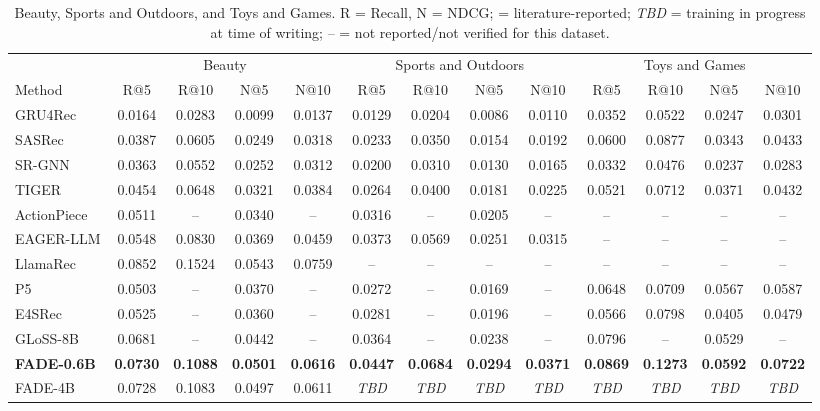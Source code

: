 \documentclass[runningheads]{llncs}
\begin{document}
\begin{table}[H]
\centering
\caption{Beauty, Sports and Outdoors, and Toys and Games. R = Recall, N = NDCG; \textdagger{} = literature-reported; \emph{TBD} = training in progress at time of writing; -- = not reported/not verified for this dataset.}
\label{tab:beauty}
\tiny
\setlength{\tabcolsep}{2pt}
\begin{tabular}{lcccccccccccc}
\toprule
& \multicolumn{4}{c}{Beauty} & \multicolumn{4}{c}{Sports and Outdoors} & \multicolumn{4}{c}{Toys and Games} \\
\cmidrule(lr){2-5} \cmidrule(lr){6-9} \cmidrule(lr){10-13}
Method & R@5 & R@10 & N@5 & N@10 & R@5 & R@10 & N@5 & N@10 & R@5 & R@10 & N@5 & N@10 \\
\midrule
GRU4Rec\textdagger{}& 0.0164 & 0.0283 & 0.0099 & 0.0137 & 0.0129 & 0.0204 & 0.0086 & 0.0110 & 0.0352 & 0.0522 & 0.0247 & 0.0301 \\
SASRec\textdagger{}& 0.0387 & 0.0605 & 0.0249 & 0.0318 & 0.0233 & 0.0350 & 0.0154 & 0.0192 & 0.0600 & 0.0877 & 0.0343 & 0.0433 \\
SR-GNN      & 0.0363 & 0.0552 & 0.0252 & 0.0312 & 0.0200 & 0.0310 & 0.0130 & 0.0165 & 0.0332 & 0.0476 & 0.0237 & 0.0283 \\
TIGER\textdagger{}       & 0.0454 & 0.0648 & 0.0321 & 0.0384 & 0.0264 & 0.0400 & 0.0181 & 0.0225 & 0.0521 & 0.0712 & 0.0371 & 0.0432 \\
ActionPiece\textdagger{} & 0.0511 & --     & 0.0340 & --     & 0.0316 & --     & 0.0205 & --     & -- & -- & -- & -- \\
EAGER-LLM\textdagger{}   & 0.0548 & 0.0830 & 0.0369 & 0.0459 & 0.0373 & 0.0569 & 0.0251 & 0.0315 & -- & -- & -- & -- \\
LlamaRec\textdagger{}    & 0.0852 & 0.1524 & 0.0543 & 0.0759 & --     & --     & --     & --     & -- & -- & -- & -- \\
P5\textdagger{}          & 0.0503 & --     & 0.0370 & --     & 0.0272 & --     & 0.0169 & --     & 0.0648 & 0.0709 & 0.0567 & 0.0587 \\
E4SRec\textdagger{}      & 0.0525 & --     & 0.0360 & --     & 0.0281 & --     & 0.0196 & --     & 0.0566 & 0.0798 & 0.0405 & 0.0479 \\
GLoSS-8B\textdagger{}    & 0.0681 & --     & 0.0442 & --     & 0.0364 & --     & 0.0238 & --     & 0.0796 & -- & 0.0529 & -- \\
\textbf{FADE-0.6B} & \textbf{0.0730} & \textbf{0.1088} & \textbf{0.0501} & \textbf{0.0616} & \textbf{0.0447} & \textbf{0.0684} & \textbf{0.0294} & \textbf{0.0371} & \textbf{0.0869} & \textbf{0.1273} & \textbf{0.0592} & \textbf{0.0722} \\
FADE-4B     & 0.0728 & 0.1083 & 0.0497 & 0.0611 & \emph{TBD} & \emph{TBD} & \emph{TBD} & \emph{TBD} & \emph{TBD} & \emph{TBD} & \emph{TBD} & \emph{TBD} \\
\bottomrule
\end{tabular}
\end{table}
\end{document}
